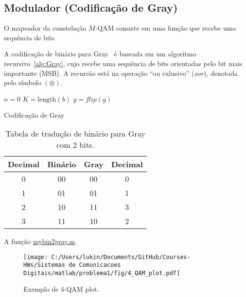 \clearpage

\subsection{Modulador (Codificação de Gray)}

O mapeador da constelação $M$-QAM consiste em uma função que recebe uma sequência de bits

A codificação de binário para Gray~\cite{Gray} é baseada em um algoritmo recursivo~\ref{alg:Gray}, cujo recebe uma sequência de bits orientadas pelo bit mais importante (MSB). A recursão está na operação ``ou exlusivo'' (\textit{xor}), denotada pelo símbolo $(\otimes)$.


\begin{algorithm}[!ht]
    \SetAlgoLined
    $n = 0$\;
    $K = \text{length}(b)$\;
    $g = flip(g)$\;
    \caption{Codificação de Gray}
    \label{alg:Gray}
\end{algorithm}

\begin{table}[!ht]
    \centering
    \begin{tabular}{|c|c|c|c|}
        \hline
        Decimal & Binário & Gray & Decimal \\ \hline
        0 & 00 & 00 & 0\\ \hline
        1 & 01 & 01 & 1\\ \hline
        2 & 10 & 11 & 3\\ \hline
        3 & 11 & 10 & 2\\ \hline
    \end{tabular}
    \caption{Tabela de tradução de binário para Gray com 2 bits.}
    \label{tab:Alfabeto_Gray}
\end{table}

A função \href{https://raw.githubusercontent.com/lucasabdalah/Courses-HWs/SCD/Sistemas%20de%20Comunicacoes%20Digitais/matlab/mybin2gray.m}{mybin2gray.m}.

\begin{figure}[!ht]
    \centering
    \texttt{[image: C:/Users/lukin/Documents/GitHub/Courses-HWs/Sistemas de Comunicacoes Digitais/matlab/problema1/fig/4\_QAM\_plot.pdf]}
    \caption{Exemplo de 4-QAM plot.}
    \label{fig:4_QAM_plot}
\end{figure}

